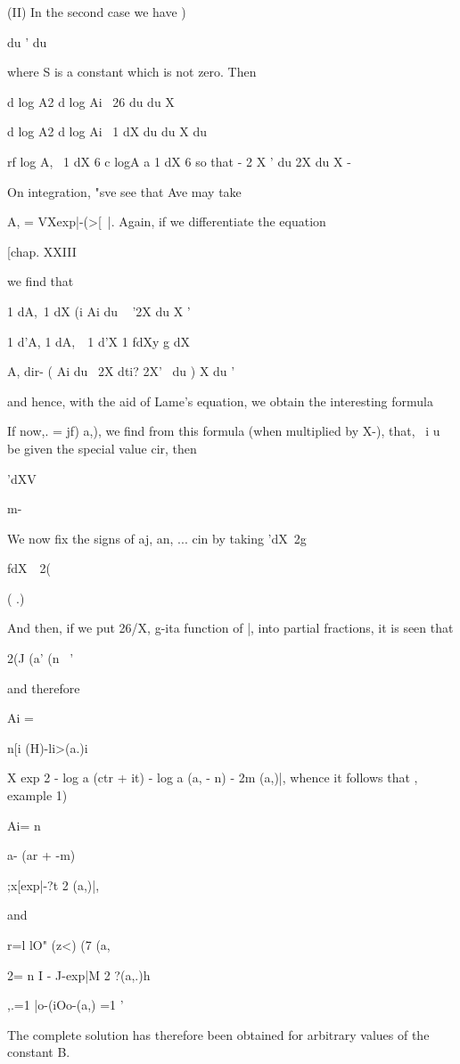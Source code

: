 {{{{{{{{(II) In the second case we have )

du ' du

where S is a constant which is not zero. Then

d log A2 d log Ai \ 26 du du X

d log A2 d log Ai \ 1 dX du du X du

rf log A, \ 1 dX 6 c logA a 1 dX 6 so that - 2 X ' du 2X du X -

%
%

On integration, "sve see that Ave may take

A, = VXexp|-(>[~|. Again, if we differentiate the equation

[chap. XXIII

we find that

1 dA,\ 1 dX (i Ai du ~ '2X du X '

1 d'A, 1 dA,\ \ 1 d'X 1 fdXy g dX

A, dir- ( Ai du \ 2X dti? 2X' \ du ) X du '

and hence, with the aid of Lame's equation, we obtain the interesting
formula

If now,. = jf) a,), we find from this formula (when multiplied by
X-), that, \ i u be given the special value cir, then

'dXV

m-

We now fix the signs of aj, an, ... cin by taking 'dX\ 2g

fdX\ \ 2(

( .)

And then, if we put 26/X, g-ita function of |, into partial fractions,
it is seen that

2(J (a' (n \ '

and therefore

Ai =

n[i (H)-li>(a.)i

X exp 2 - log a (ctr + it) - log a (a, - n) - 2m (a,)|, whence it
follows that , example 1)

Ai= n

a- (ar + -m)

;x[exp|-?t 2 (a,)|,

and

r=l lO" (z<) (7 (a,

 2= n I - J-exp|M 2 ?(a,.)h

,.=1 |o-(iOo-(a,) =1 '

The complete solution has therefore been obtained for arbitrary values
of the constant B.

}}}}}}}}

